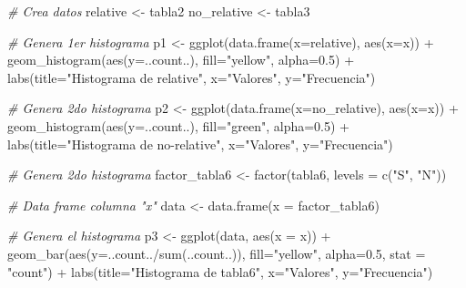 \documentclass[
]{article}
\newenvironment{Shaded}{\begin{snugshade}}{\end{snugshade}}
\newcommand{\AttributeTok}[1]{\textcolor[rgb]{0.77,0.63,0.00}{#1}}
\newcommand{\CommentTok}[1]{\textcolor[rgb]{0.56,0.35,0.01}{\textit{#1}}}
\newcommand{\FloatTok}[1]{\textcolor[rgb]{0.00,0.00,0.81}{#1}}
\newcommand{\FunctionTok}[1]{\textcolor[rgb]{0.00,0.00,0.00}{#1}}
\newcommand{\NormalTok}[1]{#1}
\newcommand{\OtherTok}[1]{\textcolor[rgb]{0.56,0.35,0.01}{#1}}
\newcommand{\SpecialCharTok}[1]{\textcolor[rgb]{0.00,0.00,0.00}{#1}}
\newcommand{\StringTok}[1]{\textcolor[rgb]{0.31,0.60,0.02}{#1}}
\begin{document}
\begin{Shaded}
\begin{Highlighting}[]
\CommentTok{\# Crea datos}
\NormalTok{relative }\OtherTok{\textless{}{-}}\NormalTok{ tabla2}
\NormalTok{no\_relative }\OtherTok{\textless{}{-}}\NormalTok{ tabla3}

\CommentTok{\# Genera 1er histograma}
\NormalTok{p1 }\OtherTok{\textless{}{-}} \FunctionTok{ggplot}\NormalTok{(}\FunctionTok{data.frame}\NormalTok{(}\AttributeTok{x=}\NormalTok{relative), }\FunctionTok{aes}\NormalTok{(}\AttributeTok{x=}\NormalTok{x)) }\SpecialCharTok{+} 
  \FunctionTok{geom\_histogram}\NormalTok{(}\FunctionTok{aes}\NormalTok{(}\AttributeTok{y=}\NormalTok{..count..), }\AttributeTok{fill=}\StringTok{"yellow"}\NormalTok{, }\AttributeTok{alpha=}\FloatTok{0.5}\NormalTok{) }\SpecialCharTok{+}
  \FunctionTok{labs}\NormalTok{(}\AttributeTok{title=}\StringTok{"Histograma de relative"}\NormalTok{, }\AttributeTok{x=}\StringTok{"Valores"}\NormalTok{, }\AttributeTok{y=}\StringTok{"Frecuencia"}\NormalTok{) }

\CommentTok{\# Genera 2do histograma}
\NormalTok{p2 }\OtherTok{\textless{}{-}} \FunctionTok{ggplot}\NormalTok{(}\FunctionTok{data.frame}\NormalTok{(}\AttributeTok{x=}\NormalTok{no\_relative), }\FunctionTok{aes}\NormalTok{(}\AttributeTok{x=}\NormalTok{x)) }\SpecialCharTok{+} 
  \FunctionTok{geom\_histogram}\NormalTok{(}\FunctionTok{aes}\NormalTok{(}\AttributeTok{y=}\NormalTok{..count..), }\AttributeTok{fill=}\StringTok{"green"}\NormalTok{, }\AttributeTok{alpha=}\FloatTok{0.5}\NormalTok{) }\SpecialCharTok{+}
  \FunctionTok{labs}\NormalTok{(}\AttributeTok{title=}\StringTok{"Histograma de no{-}relative"}\NormalTok{, }\AttributeTok{x=}\StringTok{"Valores"}\NormalTok{, }\AttributeTok{y=}\StringTok{"Frecuencia"}\NormalTok{)}

\CommentTok{\# Genera 2do histograma}
\NormalTok{factor\_tabla6 }\OtherTok{\textless{}{-}} \FunctionTok{factor}\NormalTok{(tabla6, }\AttributeTok{levels =} \FunctionTok{c}\NormalTok{(}\StringTok{"S"}\NormalTok{, }\StringTok{"N"}\NormalTok{))}

\CommentTok{\# Data frame columna "x"}
\NormalTok{data }\OtherTok{\textless{}{-}} \FunctionTok{data.frame}\NormalTok{(}\AttributeTok{x =}\NormalTok{ factor\_tabla6)}

\CommentTok{\# Genera el histograma}
\NormalTok{p3 }\OtherTok{\textless{}{-}} \FunctionTok{ggplot}\NormalTok{(data, }\FunctionTok{aes}\NormalTok{(}\AttributeTok{x =}\NormalTok{ x)) }\SpecialCharTok{+} 
  \FunctionTok{geom\_bar}\NormalTok{(}\FunctionTok{aes}\NormalTok{(}\AttributeTok{y=}\NormalTok{..count..}\SpecialCharTok{/}\FunctionTok{sum}\NormalTok{(..count..)), }\AttributeTok{fill=}\StringTok{"yellow"}\NormalTok{, }\AttributeTok{alpha=}\FloatTok{0.5}\NormalTok{, }\AttributeTok{stat =} \StringTok{"count"}\NormalTok{) }\SpecialCharTok{+}
  \FunctionTok{labs}\NormalTok{(}\AttributeTok{title=}\StringTok{"Histograma de tabla6"}\NormalTok{, }\AttributeTok{x=}\StringTok{"Valores"}\NormalTok{, }\AttributeTok{y=}\StringTok{"Frecuencia"}\NormalTok{)}


\end{Highlighting}
\end{Shaded}
\end{document}
